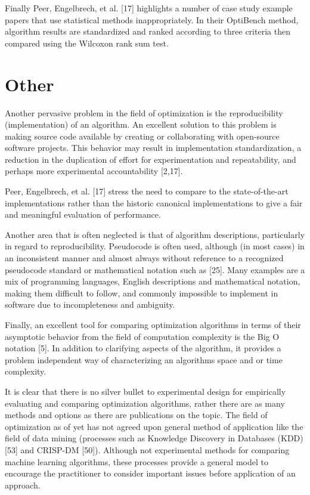\documentclass[a4paper, 11pt]{article}
\begin{document}
Finally Peer, Engelbrech, et al. [17] highlights a number of case study example papers that use statistical methods inappropriately. In their OptiBench method, algorithm results are standardized and ranked according to three criteria then compared using the Wilcoxon rank sum test.

% 
% 
\section{Other}
Another pervasive problem in the field of
optimization is the reproducibility (implementation) of an algorithm. An excellent solution to this problem is making source code available by creating or collaborating with open-source software projects. This behavior may result in implementation standardization, a reduction in the duplication of effort for experimentation and repeatability, and perhaps more experimental accountability [2,17].

Peer, Engelbrech, et al. [17] stress the need to compare to the state-of-the-art implementations rather than the historic canonical implementations to give a fair and meaningful evaluation of performance.

Another area that is often neglected is that of algorithm descriptions, particularly in regard to reproducibility. Pseudocode is often used, although (in most cases) in an inconsistent manner and almost always without reference to a recognized pseudocode standard or mathematical notation such as [25]. Many examples are a mix of programming languages, English descriptions and mathematical notation, making them difficult to follow, and commonly impossible to implement in software due to incompleteness and ambiguity.

Finally, an excellent tool for comparing optimization algorithms in terms of their asymptotic behavior from the field of computation complexity is the Big O notation [5]. In addition to clarifying aspects of the algorithm, it provides a problem independent way of characterizing an algorithms space and or time complexity.

It is clear that there is no silver bullet to experimental design for empirically evaluating and comparing optimization algorithms, rather there are as many methods and options as there are publications on the topic. The field of optimization as of yet has not agreed upon general method of application like the field of data mining (processes such as Knowledge Discovery in Databases (KDD) [53] and CRISP-DM [50]). Although not experimental methods for comparing machine learning algorithms, these processes provide a general model to encourage the practitioner to consider important issues before application of an approach.
\end{document}

